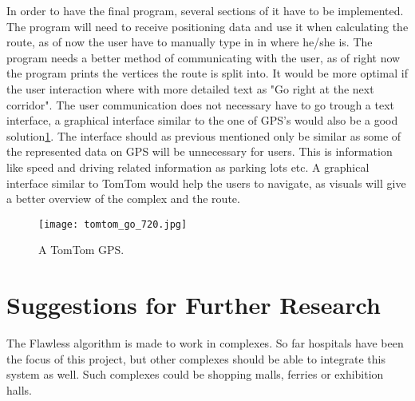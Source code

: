 In order to have the final program, several sections of it have to be implemented. The program will need to receive positioning data and use it when calculating the route, as of now the user have to manually type in in where he/she is. The program needs a better method of communicating with the user, as of right now the program prints the vertices the route is split into. It would be more optimal if the user interaction where with more detailed text as "Go right at the next corridor". The user communication does not necessary have to go trough a text interface, a graphical interface similar to the one of GPS's would also be a good solution\cref{fig:TomTom}. The interface should as previous mentioned only be similar as some of the represented data on GPS will be unnecessary for users. This is information like speed and driving related information as parking lots etc. A graphical interface similar to TomTom would help the users to navigate, as visuals will give a better overview of the complex and the route. 

\begin{figure}
\centering
  \begin{minipage}{0.45\textwidth}
    \centering
    \texttt{[image: tomtom\_go\_720.jpg]}
    \caption{A TomTom GPS. \cite{diss_tomtom}} \label{fig:TomTom}
  \end{minipage}
\end{figure}


\section{Suggestions for Further Research}

The Flawless algorithm is made to work in complexes. So far hospitals have been the focus of this project, but other complexes should be able to integrate this system as well. Such complexes could be shopping malls, ferries or exhibition halls. 

